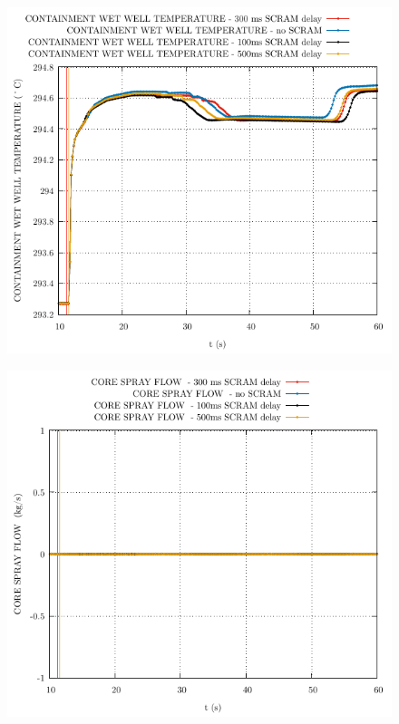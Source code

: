 \documentclass{article}
\begin{document}
\begin{multicols}{2}
\begin{figure}[H]
\end{figure}
\begin{figure}[H]
\centering
\includegraphics[width=\columnwidth]{./graphs/CONTAINMENT WET WELL TEMPERATURE_comp.pdf}
\end{figure}
\begin{figure}[H]
\centering
\includegraphics[width=\columnwidth]{./graphs/CORE SPRAY FLOW _comp.pdf}

\end{figure}
\end{multicols}
\end{document}
